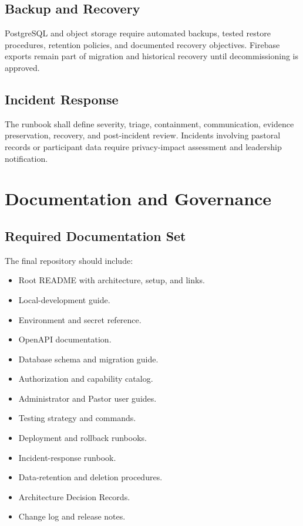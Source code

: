 \documentclass[11pt,a4paper,oneside]{report}
\begin{document}
\section{Backup and Recovery}

PostgreSQL and object storage require automated backups, tested restore procedures, retention policies, and documented recovery objectives. Firebase exports remain part of migration and historical recovery until decommissioning is approved.

\section{Incident Response}

The runbook shall define severity, triage, containment, communication, evidence preservation, recovery, and post-incident review. Incidents involving pastoral records or participant data require privacy-impact assessment and leadership notification.

\chapter{Documentation and Governance}

\section{Required Documentation Set}

The final repository should include:

\begin{itemize}
  \item Root README with architecture, setup, and links.
  \item Local-development guide.
  \item Environment and secret reference.
  \item OpenAPI documentation.
  \item Database schema and migration guide.
  \item Authorization and capability catalog.
  \item Administrator and Pastor user guides.
  \item Testing strategy and commands.
  \item Deployment and rollback runbooks.
  \item Incident-response runbook.
  \item Data-retention and deletion procedures.
  \item Architecture Decision Records.
  \item Change log and release notes.
\end{itemize}
\end{document}
